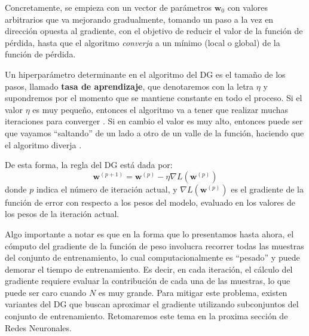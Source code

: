 \documentclass[../../main.tex]{subfiles}
\begin{document}
Concretamente, se empieza con un vector de parámetros \(\bm{w}_0\) con valores arbitrarios
que va mejorando gradualmente, tomando un paso a la vez en dirección opuesta al gradiente,
con el objetivo de reducir el valor de la función de pérdida, hasta que el algoritmo
\textit{converja} a un mínimo (local o global) de la función de pérdida.

Un hiperparámetro\footnotemark{} determinante en el algoritmo del DG es el tamaño de los
pasos, llamado \textbf{tasa de aprendizaje}, que denotaremos con la letra \(\eta\) y
supondremos por el momento que se mantiene constante en todo el proceso. Si el valor
\(\eta\) es muy pequeño, entonces el algoritmo va a tener que realizar muchas
iteraciones para converger \cite{hands-on-ML-sklearn-tf}. Si en cambio el valor es muy
alto, entonces puede ser que vayamos ``saltando'' de un lado a otro de un valle de la
función, haciendo que el algoritmo diverja \cite{hands-on-ML-sklearn-tf}.

De esta forma, la regla del DG está dada por:
\[
\bm{w}^{(p+1)} = \bm{w}^{(p)} - \eta \nabla L(\bm{w}^{(p)})
\]
donde \(p\) indica el número de iteración actual, y \(\nabla L(\bm{w}^{(p)})\) es el
gradiente de la función de error con respecto a los pesos del modelo, evaluado en los
valores de los pesos de la iteración actual.

Algo importante a notar es que en la forma que lo presentamos hasta ahora, el cómputo del
gradiente de la función de peso involucra recorrer todas las muestras del conjunto de
entrenamiento, lo cual computacionalmente es ``pesado'' y puede demorar el tiempo de
entrenamiento. Es decir, en cada iteración, el cálculo del gradiente requiere evaluar la
contribución de cada una de las muestras, lo que puede ser caro cuando \(N\) es muy
grande. Para mitigar este problema, existen variantes del DG que buscan aproximar
el gradiente utilizando subconjuntos del conjunto de entrenamiento. Retomaremos este tema
en la proxima sección de Redes Neuronales.
\end{document}
